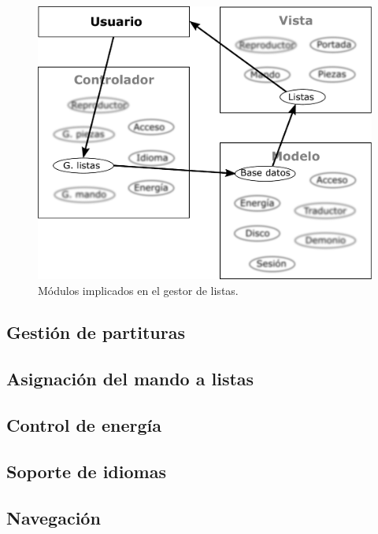 \begin{figure}[H]
	\noindent \begin{centering}
		\includegraphics[width=\linewidth/2]{capitulo4/mvc_listas}
		\par\end{centering}
	\smallskip
	\caption{\label{fig:mvc_listas} Módulos implicados en el gestor de listas.}
\end{figure} 

\smallskip

\subsection{Gestión de partituras}





\subsection{Asignación del mando a listas}

\subsection{Control de energía}

\subsection{Soporte de idiomas}

\subsection{Navegación}

